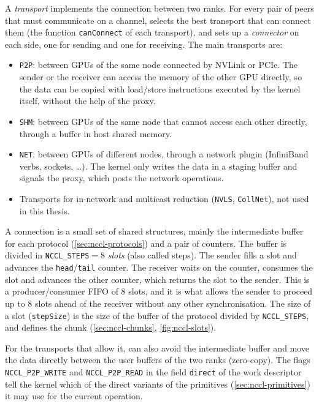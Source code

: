 A \emph{transport} implements the connection between two ranks.
For every pair of peers that must communicate on a channel, \nccl{} selects the best transport that can connect them (the function \texttt{canConnect} of each transport), and sets up a \emph{connector} on each side, one for sending and one for receiving.
The main transports are:
\begin{itemize}
  \item \texttt{P2P}: between GPUs of the same node connected by NVLink or PCIe.
  The sender or the receiver can access the memory of the other GPU directly, so the data can be copied with load/store instructions executed by the kernel itself, without the help of the proxy.
  \item \texttt{SHM}: between GPUs of the same node that cannot access each other directly, through a buffer in host shared memory.
  \item \texttt{NET}: between GPUs of different nodes, through a network plugin (InfiniBand verbs, sockets, \dots).
  The kernel only writes the data in a staging buffer and signals the proxy, which posts the network operations.
  \item Transports for in-network and multicast reduction (\texttt{NVLS}, \texttt{CollNet}), not used in this thesis.
\end{itemize}

A connection is a small set of shared structures, mainly the intermediate buffer for each protocol (\cref{sec:nccl-protocols}) and a pair of counters.
The buffer is divided in \texttt{NCCL\_STEPS}$=8$ \emph{slots} (also called steps).
The sender fills a slot and advances the \texttt{head}/\texttt{tail} counter. The receiver waits on the counter, consumes the slot and advances the other counter, which returns the slot to the sender.
This is a producer/consumer FIFO of $8$ slots, and it is what allows the sender to proceed up to $8$ slots ahead of the receiver without any other synchronisation.
The size of a slot (\texttt{stepSize}) is the size of the buffer of the protocol divided by \texttt{NCCL\_STEPS}, and defines the chunk (\cref{sec:nccl-chunks}, \cref{fig:nccl-slots}).

For the transports that allow it, \nccl{} can also avoid the intermediate buffer and move the data directly between the user buffers of the two ranks (zero-copy).
The flags \texttt{NCCL\_P2P\_WRITE} and \texttt{NCCL\_P2P\_READ} in the field \texttt{direct} of the work descriptor tell the kernel which of the direct variants of the primitives (\cref{sec:nccl-primitives}) it may use for the current operation.

